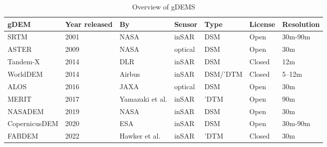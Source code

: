 \begin{table}[]
  \begin{tabular}{@{}l|llllll@{}}
    \toprule
    gDEM          & Year released & By              & Sensor  & Type     & License & Resolution \\
    \midrule
    SRTM          & 2001          & NASA            & inSAR   & DSM      & Open    & 30m-90m    \\
    ASTER         & 2009          & NASA            & optical & DSM      & Open    & 30m        \\
    Tandem-X      & 2014          & DLR             & inSAR   & DSM      & Closed  & 12m        \\
    WorldDEM      & 2014          & Airbus          & inSAR   & DSM/'DTM & Closed  & 5--12m      \\
    ALOS          & 2016          & JAXA            & optical & DSM      & Open    & 30m        \\
    MERIT         & 2017          & Yamazaki et al. & inSAR   & 'DTM     & Open    & 90m        \\
    NASADEM       & 2019          & NASA            & inSAR   & DSM      & Open    & 30m        \\
    CopernicusDEM & 2020          & ESA             & inSAR   & DSM      & Open    & 30m-90m    \\
    FABDEM        & 2022          & Hawker et al.   & inSAR   & 'DTM     & Closed  & 30m        \\
    \bottomrule
  \end{tabular}
  \caption{Overview of gDEMS}%
\label{tab:gdem_overview}
\end{table}


